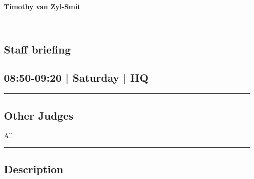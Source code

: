 \documentclass[10pt, A5]{article}
\newcommand{\newtitle}[1]{\begin{center}{\Huge\bfseries #1 }\\ \vspace{5mm}\end{center}}
\newcommand{\newsubtitle}[1]{\begin{center}{\color{grey}\Large\bfseries #1 }\\ \vspace{5mm}\end{center}}
\begin{document}
		\newtitle{Timothy van Zyl-Smit}
	\newsubtitle{}



    
	
	
	
	
	
	
	
	
	
	
	
	
	
	

		\begin{framed}
			\begin{minipage}{\textwidth}

			\setcounter{section}{13}
							\section{Staff briefing}
						
			\subsection*{08:50-09:20 | Saturday | HQ}

			\vspace{0.25cm}
			\hrule
			\vspace{0.25cm}


			\subsection*{Other Judges}
							All

					\vspace{0.25cm}
			\hrule
			\vspace{0.25cm}

			\begin{minipage}{\textwidth}
			\subsection*{\faListAlt \: Description}
			
			\end{minipage}


	\end{minipage}
	\end{framed}

	
\end{document}
